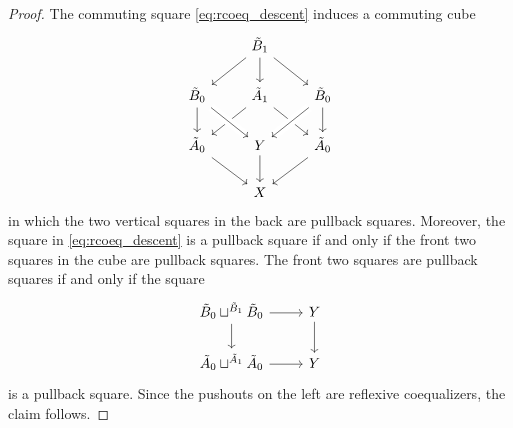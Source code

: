 \begin{proof}
The commuting square \cref{eq:rcoeq_descent} induces a commuting cube
\begin{equation*}
\begin{tikzcd}
& \tilde{B}_1 \arrow[dl] \arrow[dr] \arrow[d] \\
\tilde{B}_0 \arrow[d] & \tilde{A}_1 \arrow[dl] \arrow[dr] & \tilde{B}_0 \arrow[d] \arrow[dl,crossing over] \\
\tilde{A}_0 \arrow[dr] & Y \arrow[from=ul,crossing over] \arrow[d] & \tilde{A}_0 \arrow[dl] \\
& X
\end{tikzcd}
\end{equation*}
in which the two vertical squares in the back are pullback squares. Moreover, the square in \cref{eq:rcoeq_descent} is a pullback square if and only if the front two squares in the cube are pullback squares. The front two squares are pullback squares if and only if the square
\begin{equation*}
\begin{tikzcd}
\tilde{B}_0 \sqcup^{\tilde{B}_1} \tilde{B}_0 \arrow[r] \arrow[d] & Y \arrow[d] \\
\tilde{A}_0 \sqcup^{\tilde{A}_1} \tilde{A}_0 \arrow[r] & Y
\end{tikzcd}
\end{equation*}
is a pullback square. Since the pushouts on the left are reflexive coequalizers, the claim follows.
\end{proof}

